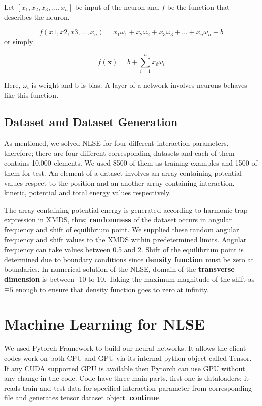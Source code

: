 \documentclass[a4paper,times,12pt]{article}
\begin{document}
Let $[x_1, x_2, x_3, ..., x_n]$ be input of the neuron and $f$ be the function that describes the neuron.

$$f(x1, x2, x3, ..., x_n) = x_1\omega_1 + x_2\omega_2 + x_3\omega_3 + ... + x_n\omega_n + b$$ or simply

$$f(\textbf{x}) = b + \sum\limits_{i = 1}^n x_i\omega_i $$

Here, $\omega_i$ is weight and b is bias. A layer of a network involves neurons behaves like this function. 

\subsection{Dataset and Dataset Generation}

As mentioned, we solved NLSE for four different interaction parameters, therefore; there are four different corresponding datasets and each of them contains 10.000 elements. We used 8500 of them as training examples and 1500 of them for test. An element of a dataset involves an array containing potential values respect to the position and an another array containing interaction, kinetic, potential and total energy values respectively. 

The array containing potential energy is generated according to harmonic trap expression in XMDS, thus; \textbf{randomness} of the dataset occurs in angular frequency and shift of equilibrium point. We supplied these random angular frequency and shift values to the XMDS within predetermined limits. Angular frequency can take values between 0.5 and 2. Shift of the equilibrium point is determined due to boundary conditions since \textbf{density function} must be zero at boundaries. In numerical solution of the NLSE, domain of the \textbf{transverse dimension} is between -10 to 10. Taking the maximum magnitude of the shift as $\mp 5$ enough to ensure that density function goes to zero at infinity.


\section{Machine Learning for NLSE}

We used Pytorch Framework to build our neural networks. It allows the client codes work on both CPU and GPU via its internal python object called Tensor. If any CUDA supported GPU is available then Pytorch can use GPU without any change in the code. Code have three main parts, first one is dataloaders; it reads train and test data for specified interaction parameter from corresponding file and generates tensor dataset object. \textbf{continue}
\end{document}
